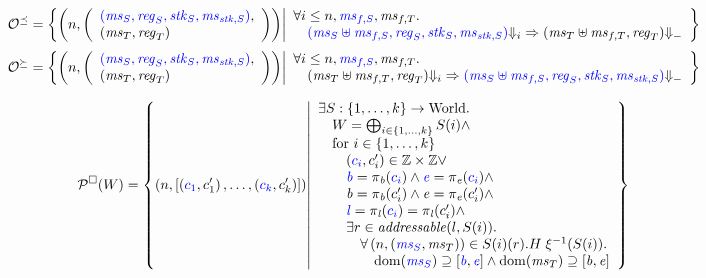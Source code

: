 \documentclass[a4paper]{article}
\begin{document}
\[
  \lrol = \left\{ \npair{\left(\array{l}\src{(\ms_S,\reg_S,\stk_S,\ms_{\stk,S})},\\(\ms_T,\reg_T)\endarray\right)} \middle|
    \begin{array}{l}
      \forall i \leq n, \src{\ms_{f,S}}, \ms_{f,T} \ldotp \\
      \quad \src{(\ms_S \uplus \ms_{f,S},\reg_S,\stk_S,\ms_{\stk,S})} \term[i] \Rightarrow (\ms_T \uplus \ms_{f,T},\reg_T) \term\\
    \end{array}
\right\}
\]
\[
  \lror = \left\{ \npair{\left(\array{l}\src{(\ms_S,\reg_S,\stk_S,\ms_{\stk,S})},\\(\ms_T,\reg_T)\endarray\right)} \middle|
    \begin{array}{l}
      \forall i \leq n, \src{\ms_{f,S}}, \ms_{f,T} \ldotp \\
      \quad (\ms_T \uplus \ms_{f,T},\reg_T) \term[i] \Rightarrow \src{(\ms_S \uplus \ms_{f,S},\reg_S,\stk_S,\ms_{\stk,S})} \term
    \end{array}
\right\}
\]



\[
  \lrp(W) =
    \left\{
    \npair{ [\stpair[.]{c_1}{c'_1}, \dots, \stpair[.]{c_k}{c'_k}] } \middle| 
    \begin{array}{l}
      \exists S : \{1,\dots,k\} \fun \World \ldotp \\
      \quad W = \bigoplus_{i\in\{1,\dots,k\}} S(i)\wedge \\
      \quad\text{for $i \in \{1,\dots,k\}$} \\
      \qquad\stpair[.]{c_i}{c'_i} \in \ints \times \ints \vee \\
      \qquad\src{\baddr} = \pi_\baddr(\src{c_i}) \wedge \src{\eaddr} = \pi_\eaddr(\src{c_i}) \wedge \\
      \qquad\baddr = \pi_\baddr(c_i') \wedge \eaddr = \pi_\eaddr(c_i') \wedge \\
      \qquad\src{\lin} = \pi_\lin(\src{c_i}) = \pi_\lin(c_i') \wedge \\
      \qquad \exists r \in \addressable{l,S(i)} \ldotp\\
      \qquad \quad \forall \npair{\stpair{\ms}{\ms}} \in S(i)(r).H \; \xi^{-1}(S(i))  \ldotp \\
      \qquad \qquad \dom(\src{\ms_S}) \supseteq [\src{\baddr},\src{\eaddr}] \wedge \dom(\ms_T) \supseteq [\baddr,\eaddr]      
    \end{array}
  \right\}
\]
\end{document}
